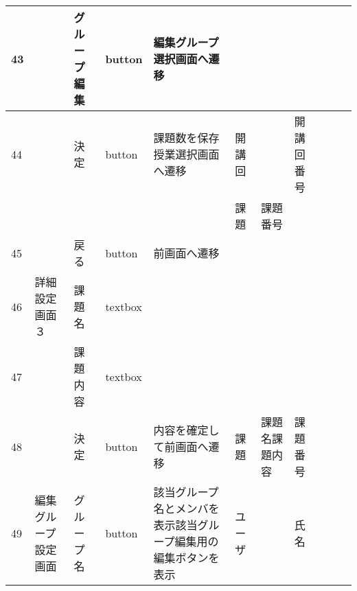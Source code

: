 \begin{landscape}
\begin{table}[]
\begin{tabular}{|l|l|l|l|l|l|l|l|l|l|l|}
43  &               & グループ編集           & button   & 編集グループ選択画面へ遷移                                                     &         &                       &                    &                 &                               &                                                                \\ \hline
44  &               & 決定               & button   & 課題数を保存授業選択画面へ遷移                                                   & 開講回     &                       & 開講回番号              &                 &                               &                                                                \\ \hline
    &               &                  &          &                                                                   & 課題      & 課題番号                  &                    &                 &                               &                                                                \\ \hline
45  &               & 戻る               & button   & 前画面へ遷移                                                            &         &                       &                    &                 &                               &                                                                \\ \hline
46  & 詳細設定画面３       & 課題名              & textbox  &                                                                   &         &                       &                    &                 &                               &                                                                \\ \hline
47  &               & 課題内容             & textbox  &                                                                   &         &                       &                    &                 &                               &                                                                \\ \hline
48  &               & 決定               & button   & 内容を確定して前画面へ遷移                                                     & 課題      & 課題名課題内容               & 課題番号               &                 &                               &                                                                \\ \hline
49  & 編集グループ設定画面    & グループ名            & button   & 該当グループ名とメンバを表示該当グループ編集用の編集ボタンを表示                                  & ユーザ     &                       & 氏名                 &                 &                               &                                                                \\ \hline

\end{tabular}
\end{table}
\end{landscape}
